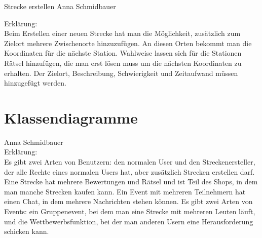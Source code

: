 \documentclass[a4paper, 12pp]{article}
\begin{document}
{\Large Strecke erstellen}
Anna Schmidbauer
\begin{figure}[H] 
\centering
	\fbox{\begin{minipage}{16cm} 
	\end{minipage}}
\end{figure}

Erklärung:\\
Beim Erstellen einer neuen Strecke hat man die Möglichkeit, zusätzlich zum Zielort mehrere Zwischenorte hinzuzufügen. An diesen Orten bekommt man die Koordinaten für die nächste Station. Wahlweise lassen sich für die Stationen Rätsel hinzufügen, die man erst lösen muss um die nächsten Koordinaten zu erhalten. Der Zielort, Beschreibung, Schwierigkeit und Zeitaufwand müssen hinzugefügt werden.\\

\section{Klassendiagramme}


\begin{figure}[H] 
\centering
	\fbox{\begin{minipage}{16cm} 
	\end{minipage}}
\end{figure}
Anna Schmidbauer\\
Erklärung:\\
Es gibt zwei Arten von Benutzern: den normalen User und den Streckenersteller, der alle Rechte eines normalen Users hat, aber zusätzlich Strecken erstellen darf. Eine Strecke hat mehrere Bewertungen und Rätsel und ist Teil des Shops, in dem man manche Strecken kaufen kann. Ein Event mit mehreren Teilnehmern hat einen Chat, in dem mehrere Nachrichten stehen können. Es gibt zwei Arten von Events: ein Gruppenevent, bei dem man eine Strecke mit mehreren Leuten läuft, und die Wettbewerbsfunktion, bei der man anderen Usern eine Herausforderung schicken kann.\\
\end{document}
